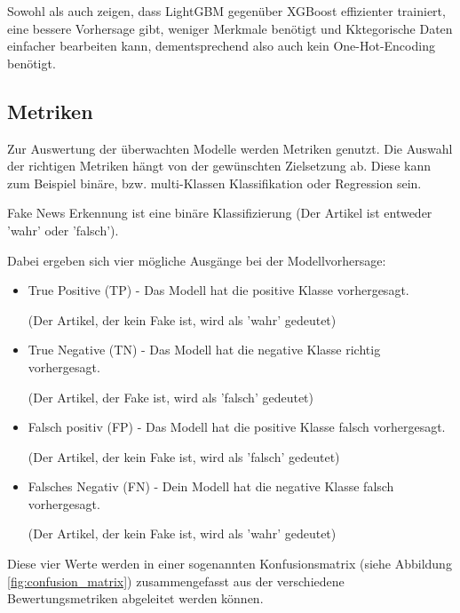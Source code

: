 Sowohl \cite{ke2017} als auch \cite{hu2020} zeigen, dass LightGBM gegenüber XGBoost effizienter trainiert, eine bessere Vorhersage gibt, weniger
Merkmale benötigt und Kktegorische Daten einfacher bearbeiten kann, dementsprechend also auch kein One-Hot-Encoding benötigt.

\subsection{Metriken}

Zur Auswertung der überwachten Modelle werden Metriken genutzt. Die Auswahl der richtigen Metriken hängt von der gewünschten Zielsetzung ab.
Diese kann zum Beispiel binäre, bzw. multi-Klassen Klassifikation oder Regression sein.

Fake News Erkennung ist eine binäre Klassifizierung (Der Artikel ist entweder 'wahr' oder 'falsch').

Dabei ergeben sich vier mögliche Ausgänge bei der Modellvorhersage:
\begin{itemize}
    \item True Positive (TP) - Das Modell hat die positive Klasse vorhergesagt. 
        
    (Der Artikel, der kein Fake ist, wird als 'wahr' gedeutet)
    \item True Negative (TN) - Das Modell hat die negative Klasse richtig vorhergesagt.
        
    (Der Artikel, der Fake ist, wird als 'falsch' gedeutet)
    \item Falsch positiv (FP) - Das Modell hat die positive Klasse falsch vorhergesagt. 
        
    (Der Artikel, der kein Fake ist, wird als 'falsch' gedeutet)
    \item Falsches Negativ (FN) - Dein Modell hat die negative Klasse falsch vorhergesagt. 
        
    (Der Artikel, der kein Fake ist, wird als 'wahr' gedeutet)
\end{itemize}

Diese vier Werte werden in einer sogenannten Konfusionsmatrix  (siehe Abbildung \ref{fig:confusion_matrix}) zusammengefasst
aus der verschiedene Bewertungsmetriken abgeleitet werden können.

